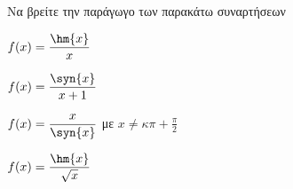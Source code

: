 Να βρείτε την παράγωγο των παρακάτω συναρτήσεων
\begin{multicols}{2}
\begin{alist}
\item $ f(x)=\dfrac{\hm{x}}{x} $
\item $ f(x)=\dfrac{\syn{x}}{x+1} $
\item $ f(x)=\dfrac{x}{\syn{x}} $ με $ x\neq\kappa\pi+\frac{\pi}{2} $
\item $ f(x)=\dfrac{\hm{x}}{\sqrt{x}} $
\end{alist}
\end{multicols}

